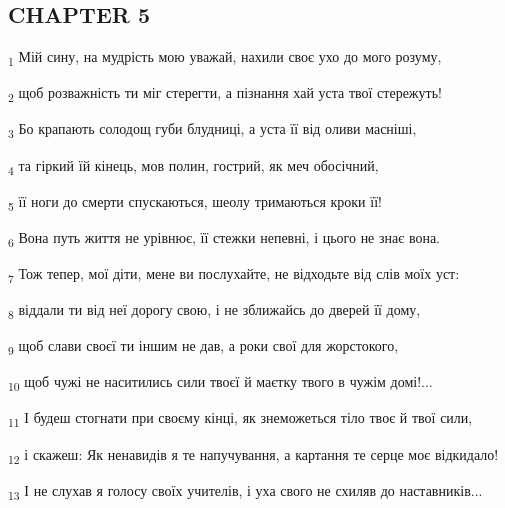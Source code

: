 \subsection{CHAPTER 5}
\begin{tcolorbox}
\textsubscript{1} Мій сину, на мудрість мою уважай, нахили своє ухо до мого розуму,
\end{tcolorbox}
\begin{tcolorbox}
\textsubscript{2} щоб розважність ти міг стерегти, а пізнання хай уста твої стережуть!
\end{tcolorbox}
\begin{tcolorbox}
\textsubscript{3} Бо крапають солодощ губи блудниці, а уста її від оливи масніші,
\end{tcolorbox}
\begin{tcolorbox}
\textsubscript{4} та гіркий їй кінець, мов полин, гострий, як меч обосічний,
\end{tcolorbox}
\begin{tcolorbox}
\textsubscript{5} її ноги до смерти спускаються, шеолу тримаються кроки її!
\end{tcolorbox}
\begin{tcolorbox}
\textsubscript{6} Вона путь життя не урівнює, її стежки непевні, і цього не знає вона.
\end{tcolorbox}
\begin{tcolorbox}
\textsubscript{7} Тож тепер, мої діти, мене ви послухайте, не відходьте від слів моїх уст:
\end{tcolorbox}
\begin{tcolorbox}
\textsubscript{8} віддали ти від неї дорогу свою, і не зближайсь до дверей її дому,
\end{tcolorbox}
\begin{tcolorbox}
\textsubscript{9} щоб слави своєї ти іншим не дав, а роки свої для жорстокого,
\end{tcolorbox}
\begin{tcolorbox}
\textsubscript{10} щоб чужі не наситились сили твоєї й маєтку твого в чужім домі!...
\end{tcolorbox}
\begin{tcolorbox}
\textsubscript{11} І будеш стогнати при своєму кінці, як знеможеться тіло твоє й твої сили,
\end{tcolorbox}
\begin{tcolorbox}
\textsubscript{12} і скажеш: Як ненавидів я те напучування, а картання те серце моє відкидало!
\end{tcolorbox}
\begin{tcolorbox}
\textsubscript{13} І не слухав я голосу своїх учителів, і уха свого не схиляв до наставників...
\end{tcolorbox}
